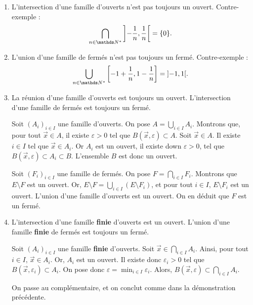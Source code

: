 \begin{rmk}
	\begin{enumerate}
		\item L'intersection d'une famille d'ouverts n'est pas toujours un ouvert. Contre-exemple : \[\bigcap_{n\in\N^*} \left]{-\frac{1}{n}},\frac{1}{n}\right[ = \{0\}.\]
		\item L'union d'une famille de fermés n'est pas toujours un fermé. Contre-exemple : \[\bigcup_{n\in\N^*} \left[-1+\frac{1}{n}, 1 - \frac{1}{n} \right] = {]{-1},1[}.\]
		\item La réunion d'une famille d'ouverts est toujours un ouvert. L'intersection d'une famille de fermés est toujours un fermé.
			\begin{prv}
				Soit $(A_i)_{i\in I}$\/ une famille d'ouverts. On pose $A = \bigcup_{i \in I} A_i$.
				Montrons que, pour tout $\vec{x} \in A$, il existe $\varepsilon > 0$ tel que $B(\vec{x}, \varepsilon) \subset A$.
				Soit $\vec{x} \in A$. Il existe $i \in I$\/ tel que $\vec{x} \in A_i$. Or $A_i$\/ est un ouvert, il existe down $\varepsilon > 0$, tel que $B(\vec{x}, \varepsilon) \subset A_i \subset B$. L'ensemble $B$\/ est donc un ouvert.

				Soit $(F_i)_{i\in I}$\/ une famille de fermés. On pose $F = \bigcap_{i \in I} F_i$. Montrons que $E \setminus F$\/ est un ouvert.
				Or, $E \setminus F = \bigcup_{i \in I} (E \setminus F_i)$, et pour tout $i \in I$, $E \setminus F_i$\/ est un ouvert. L'union d'une famille d'ouverts est un ouvert. On en déduit que $F$\/ est un fermé.
			\end{prv}
		\item L'intersection d'une famille \textbf{finie} d'ouverts est un ouvert. L'union d'une famille \textbf{finie} de fermés est toujours un fermé.
			\begin{prv}
				Soit $(A_i)_{i\in I}$\/ une famille \textbf{finie} d'ouverts. Soit $\vec{x} \in \bigcap_{i \in I} A_i$. Ainsi, pour tout $i \in I$, $\vec{x} \in A_i$. Or, $A_i$\/ est un ouvert. Il existe donc $\varepsilon_i > 0$\/ tel que $B(\vec{x}, \varepsilon_i) \subset A_i$.
				On pose donc $\varepsilon = \min_{i \in I} \varepsilon_i$. Alors, $B(\vec{x}, \varepsilon) \subset \bigcap_{i \in I} A_i$.

				On passe au complémentaire, et on conclut comme dans la démonstration précédente.
			\end{prv}
	\end{enumerate}
\end{rmk}

